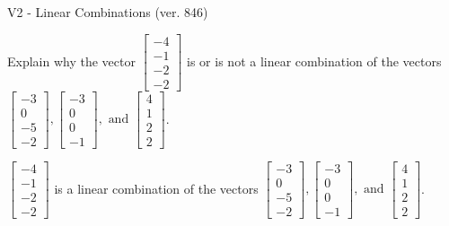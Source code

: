 \begin{exercise}
  \begin{exerciseTitle}V2 - Linear Combinations (ver. 846)\end{exerciseTitle}
  \begin{exerciseStatement}
    Explain why the vector \(\left[\begin{array}{c}
-4 \\
-1 \\
-2 \\
-2
\end{array}\right]\)  is or is not a linear 
	combination of the vectors \(\left[\begin{array}{c}
-3 \\
0 \\
-5 \\
-2
\end{array}\right] , \left[\begin{array}{c}
-3 \\
0 \\
0 \\
-1
\end{array}\right] , \text{ and } \left[\begin{array}{c}
4 \\
1 \\
2 \\
2
\end{array}\right]\).
	


  \end{exerciseStatement}
  \begin{exerciseAnswer}
   \(\left[\begin{array}{c}
-4 \\
-1 \\
-2 \\
-2
\end{array}\right]\) 
  	 is  
	a linear combination of the vectors \(\left[\begin{array}{c}
-3 \\
0 \\
-5 \\
-2
\end{array}\right] , \left[\begin{array}{c}
-3 \\
0 \\
0 \\
-1
\end{array}\right] , \text{ and } \left[\begin{array}{c}
4 \\
1 \\
2 \\
2
\end{array}\right]\).

	
  


  \end{exerciseAnswer}
\end{exercise}